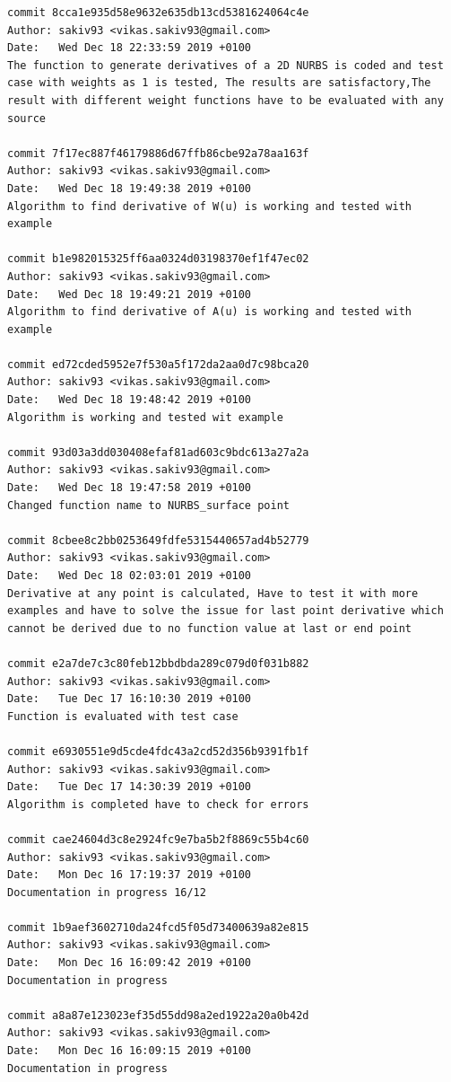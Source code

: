 \documentclass[11pt]{article}
\begin{document}
\begin{Verbatim}[breaklines=true]
commit 8cca1e935d58e9632e635db13cd5381624064c4e
Author: sakiv93 <vikas.sakiv93@gmail.com>
Date:   Wed Dec 18 22:33:59 2019 +0100
The function to generate derivatives of a 2D NURBS is coded and test case with weights as 1 is tested, The results are satisfactory,The result with different weight functions have to be evaluated with any source

commit 7f17ec887f46179886d67ffb86cbe92a78aa163f
Author: sakiv93 <vikas.sakiv93@gmail.com>
Date:   Wed Dec 18 19:49:38 2019 +0100
Algorithm to find derivative of W(u) is working and tested with example

commit b1e982015325ff6aa0324d03198370ef1f47ec02
Author: sakiv93 <vikas.sakiv93@gmail.com>
Date:   Wed Dec 18 19:49:21 2019 +0100
Algorithm to find derivative of A(u) is working and tested with example

commit ed72cded5952e7f530a5f172da2aa0d7c98bca20
Author: sakiv93 <vikas.sakiv93@gmail.com>
Date:   Wed Dec 18 19:48:42 2019 +0100
Algorithm is working and tested wit example

commit 93d03a3dd030408efaf81ad603c9bdc613a27a2a
Author: sakiv93 <vikas.sakiv93@gmail.com>
Date:   Wed Dec 18 19:47:58 2019 +0100
Changed function name to NURBS_surface point

commit 8cbee8c2bb0253649fdfe5315440657ad4b52779
Author: sakiv93 <vikas.sakiv93@gmail.com>
Date:   Wed Dec 18 02:03:01 2019 +0100
Derivative at any point is calculated, Have to test it with more examples and have to solve the issue for last point derivative which cannot be derived due to no function value at last or end point

commit e2a7de7c3c80feb12bbdbda289c079d0f031b882
Author: sakiv93 <vikas.sakiv93@gmail.com>
Date:   Tue Dec 17 16:10:30 2019 +0100
Function is evaluated with test case

commit e6930551e9d5cde4fdc43a2cd52d356b9391fb1f
Author: sakiv93 <vikas.sakiv93@gmail.com>
Date:   Tue Dec 17 14:30:39 2019 +0100
Algorithm is completed have to check for errors

commit cae24604d3c8e2924fc9e7ba5b2f8869c55b4c60
Author: sakiv93 <vikas.sakiv93@gmail.com>
Date:   Mon Dec 16 17:19:37 2019 +0100
Documentation in progress 16/12

commit 1b9aef3602710da24fcd5f05d73400639a82e815
Author: sakiv93 <vikas.sakiv93@gmail.com>
Date:   Mon Dec 16 16:09:42 2019 +0100
Documentation in progress

commit a8a87e123023ef35d55dd98a2ed1922a20a0b42d
Author: sakiv93 <vikas.sakiv93@gmail.com>
Date:   Mon Dec 16 16:09:15 2019 +0100
Documentation in progress


\end{Verbatim}
\end{document}
